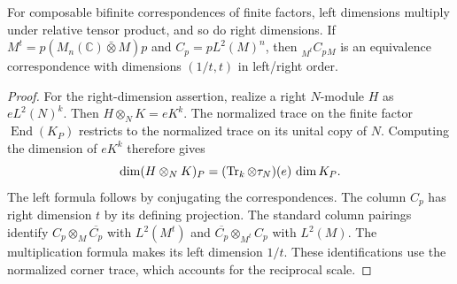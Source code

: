 \begin{lemma}
\label{lem:endpoints-equivalence-dimensions}
For composable bifinite correspondences of finite factors, left
dimensions multiply under relative tensor product, and so do right
dimensions.  If
\(M^t=p(M_n(\mathbb C)\bar\otimes M)p\) and
\(C_p=pL^2(M)^n\), then \({}_{M^t}C_p{}_M\) is an equivalence
correspondence with dimensions \((1/t,t)\) in left/right order.
\end{lemma}

\begin{proof}
For the right-dimension assertion, realize a right \(N\)-module
\(H\) as \(eL^2(N)^k\).  Then
\(H\otimes_N K=eK^k\).  The normalized trace on the finite factor
\(\operatorname{End}(K_P)\) restricts to the normalized trace on its
unital copy of \(N\).  Computing the dimension of \(eK^k\) therefore
gives
\[
 \dim(H\otimes_N K)_P
  =(\operatorname{Tr}_k\otimes\tau_N)(e)\,\dim K_P.
\]
The left formula follows by conjugating the correspondences.
The column \(C_p\) has right dimension \(t\) by its defining
projection.  The standard column pairings identify
\(C_p\otimes_M\overline{C_p}\) with \(L^2(M^t)\) and
\(\overline{C_p}\otimes_{M^t}C_p\) with \(L^2(M)\).
The multiplication formula makes its left dimension \(1/t\).
These identifications use the normalized corner trace, which accounts
for the reciprocal scale.
\end{proof}

